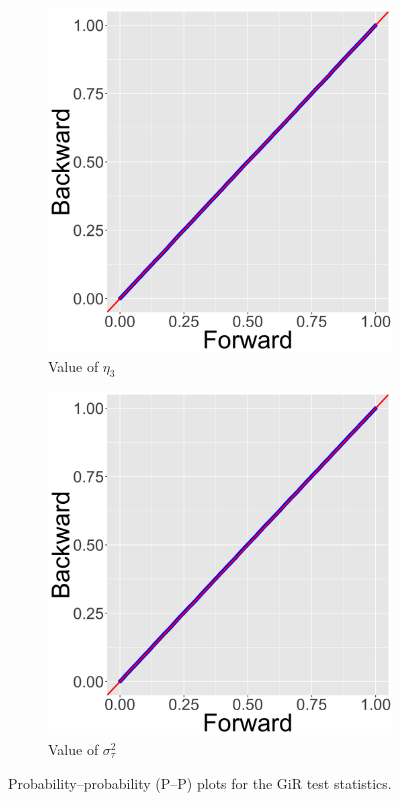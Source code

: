 \documentclass[ba]{imsart}
\numberwithin{equation}{section}
\theoremstyle{plain}
\begin{document}
\begin{figure}[!t]
\begin{subfigure}[b]{0.2425\textwidth}
			\end{subfigure}   	   		   	   	
			\begin{subfigure}[b]{0.2425\textwidth}
				\caption{Value of $\eta_3$}
				\includegraphics[width=\textwidth]{img/plot11.png}	
			\end{subfigure}   	   		   	   	  		   	   	 	
			\begin{subfigure}[b]{0.2425\textwidth}
				\caption{Value of $\sigma^2_\tau$}
				\includegraphics[width=\textwidth]{img/plot12.png}	
			\end{subfigure}   	   		   	   	   	   		   	   	   		   	   	
			\caption{Probability--probability (P--P) plots for the GiR test statistics.}
			\label{figure:GiRplot}
		\end{figure}   
\end{document}
